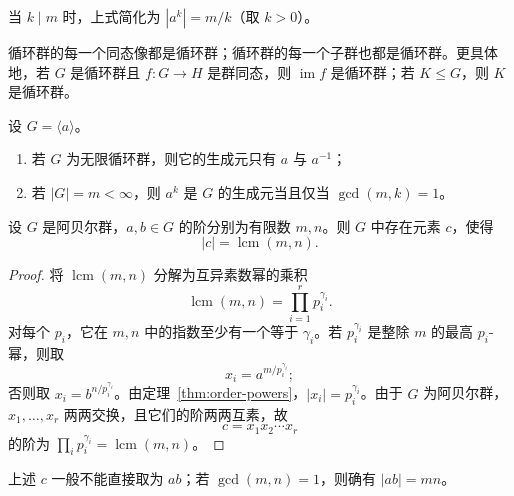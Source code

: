 \begin{purplenote}
当 $k\mid m$ 时，上式简化为 $|a^k|=m/k$（取 $k>0$）。
\end{purplenote}

\begin{theorem}\label{thm:cyclic-images-subgroups}
循环群的每一个同态像都是循环群；循环群的每一个子群也都是循环群。更具体地，若 $G$ 是循环群且 $f:G\to H$ 是群同态，则 $\operatorname{im}f$ 是循环群；若 $K\leq G$，则 $K$ 是循环群。
\end{theorem}

\begin{theorem}[循环群的生成元]\label{thm:cyclic-generators}
设 $G=\langle a\rangle$。
\begin{enumerate}[label=(\arabic*)]
  \item 若 $G$ 为无限循环群，则它的生成元只有 $a$ 与 $a^{-1}$；
  \item 若 $|G|=m<\infty$，则 $a^k$ 是 $G$ 的生成元当且仅当 $\gcd(m,k)=1$。
\end{enumerate}
\end{theorem}

\begin{proposition}\label{prop:abelian-lcm-order}
设 $G$ 是阿贝尔群，$a,b\in G$ 的阶分别为有限数 $m,n$。则 $G$ 中存在元素 $c$，使得
\[
  |c|=\operatorname{lcm}(m,n).
\]
\end{proposition}

\begin{proof}
将 $\operatorname{lcm}(m,n)$ 分解为互异素数幂的乘积
\[
  \operatorname{lcm}(m,n)=\prod_{i=1}^r p_i^{\gamma_i}.
\]
对每个 $p_i$，它在 $m,n$ 中的指数至少有一个等于 $\gamma_i$。若 $p_i^{\gamma_i}$ 是整除 $m$ 的最高 $p_i$-幂，则取
\[
  x_i=a^{m/p_i^{\gamma_i}};
\]
否则取 $x_i=b^{n/p_i^{\gamma_i}}$。由定理~\ref{thm:order-powers}，$|x_i|=p_i^{\gamma_i}$。由于 $G$ 为阿贝尔群，$x_1,\ldots,x_r$ 两两交换，且它们的阶两两互素，故
\[
  c=x_1x_2\cdots x_r
\]
的阶为 $\prod_i p_i^{\gamma_i}=\operatorname{lcm}(m,n)$。
\end{proof}

\begin{purplenote}
上述 $c$ 一般不能直接取为 $ab$；若 $\gcd(m,n)=1$，则确有 $|ab|=mn$。
\end{purplenote}

